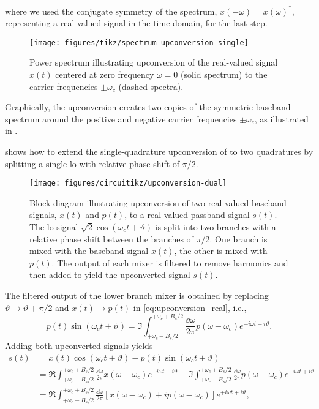 where we used the conjugate symmetry of the spectrum, $x(-\omega)=x(\omega)^*$, representing a real-valued signal in the time domain, for the last step.
\begin{figure}[htb]
	\centering
	\texttt{[image: figures/tikz/spectrum-upconversion-single]}
	\caption{Power spectrum illustrating upconversion of the real-valued signal $x(t)$ centered at zero frequency $\omega=0$ (solid spectrum) to the carrier frequencies $\pm\omega_c$ (dashed spectra).}\label{fig:spectrum_upconversion_single}
\end{figure}
Graphically, the upconversion creates two copies of the symmetric baseband spectrum around the positive and negative carrier frequencies $\pm\omega_c$, as illustrated in .

 shows how to extend the single-quadrature upconversion of  to two quadratures by splitting a single \gls{lo} with relative phase shift of $\pi/2$.
\begin{figure}[htb]
	\centering
	\texttt{[image: figures/circuitikz/upconversion-dual]}
	\caption{Block diagram illustrating upconversion of two real-valued baseband signals, $x(t)$ and $p(t)$, to a real-valued passband signal $s(t)$. The \gls{lo} signal $\sqrt{2}\cos(\omega_ct+\vartheta)$ is split into two branches with a relative phase shift between the branches of $\pi/2$. One branch is mixed with the baseband signal $x(t)$, the other is mixed with $p(t)$. The output of each mixer is filtered to remove harmonics and then added to yield the upconverted signal $s(t)$.}\label{fig:upconversion_dual}
\end{figure}
The filtered output of the lower branch mixer is obtained by replacing $\vartheta\to\vartheta+\pi/2$ and $x(t)\to p(t)$ in \cref{eq:upconversion_real}, i.e.,
\begin{equation}
	p(t)
	\sin(\omega_ct+\vartheta)
	=
	\Im
	\int_{+\omega_c-B_s/2}^{+\omega_c+B_s/2}
	\frac{\dd{\omega}}{2\pi}
	p(\omega-\omega_c)
	e^{+i\omega t+i\vartheta}
	.
	\label{eq:upconversion_real}
\end{equation}
Adding both upconverted signals yields
\begin{equation}
	\begin{split}
		s(t)
		&=
		x(t)
		\cos(\omega_ct+\vartheta)
		-
		p(t)
		\sin(\omega_ct+\vartheta)
		\\
		&=
		\Re
		\int_{+\omega_c-B_s/2}^{+\omega_c+B_s/2}
		\frac{\dd{\omega}}{2\pi}
		x(\omega-\omega_c)
		e^{+i\omega t+i\vartheta}
		-
		\Im
		\int_{+\omega_c-B_s/2}^{+\omega_c+B_s/2}
		\frac{\dd{\omega}}{2\pi}
		p(\omega-\omega_c)
		e^{+i\omega t+i\vartheta}
		\\
		&=
		\Re
		\int_{+\omega_c-B_s/2}^{+\omega_c+B_s/2}
		\frac{\dd{\omega}}{2\pi}
		\left[
			x(\omega-\omega_c)
			+
			ip(\omega-\omega_c)
		\right]
		e^{+i\omega t+i\vartheta}
		,
	\end{split}
	\label{eq:upconversion_dual}
\end{equation}
